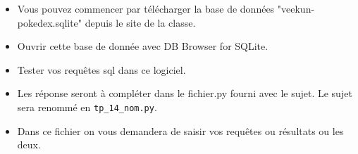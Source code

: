 \begin{itemize}
\item Vous pouvez commencer par télécharger la base de données "veekun-pokedex.sqlite" depuis le site de la classe.
\item Ouvrir cette base de donnée avec DB Browser for SQLite.
\item Tester vos requêtes sql dans ce logiciel.
\item Les réponse seront à compléter dans le fichier.py fourni avec le sujet. Le sujet sera renommé en \texttt{tp\_14\_nom.py}.
\item Dans ce fichier on vous demandera de saisir vos requêtes ou résultats ou les deux.
\end{itemize}


